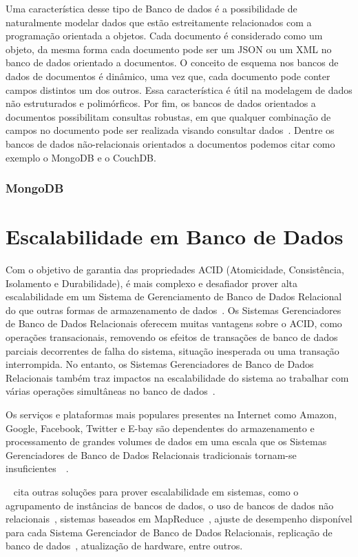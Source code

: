 \documentclass[a4paper,12pt,onecolumn,titlepage]{article}
\begin{document}
Uma característica desse tipo de Banco de dados é a possibilidade de naturalmente modelar dados que estão estreitamente relacionados com a programação orientada a objetos. Cada documento é considerado como um objeto, da mesma forma cada documento pode ser um JSON ou um XML no banco de dados orientado a documentos. O conceito de esquema nos bancos de dados de documentos é dinâmico, uma vez que, cada documento pode conter campos distintos um dos outros. Essa característica é útil na modelagem de dados não estruturados e polimórficos. Por fim, os bancos de dados orientados a documentos possibilitam consultas robustas, em que qualquer combinação de campos no documento pode ser realizada visando consultar dados~\citep{patil:2017}. Dentre os bancos de dados não-relacionais orientados a documentos podemos citar como exemplo o MongoDB e o CouchDB.

\subsubsection{MongoDB}
\label{subsubsec:mongo}

\section{Escalabilidade em Banco de Dados}
\label{sec:escalabilidade}

Com o objetivo de garantia das propriedades ACID (Atomicidade, Consistência, Isolamento e Durabilidade), é mais complexo e desafiador prover alta escalabilidade em um Sistema de Gerenciamento de Banco de Dados Relacional do que outras formas de armazenamento de dados~\citep{fisher:2011}. Os Sistemas Gerenciadores de Banco de Dados Relacionais oferecem muitas vantagens sobre o ACID, como operações transacionais, removendo os efeitos de transações de banco de dados parciais decorrentes de falha do sistema, situação inesperada ou uma transação interrompida. No entanto, os Sistemas Gerenciadores de Banco de Dados Relacionais também traz impactos na escalabilidade do sistema ao trabalhar com várias operações simultâneas no banco de dados~\citep{silva:2015}.

Os serviços e plataformas mais populares presentes na Internet como Amazon, Google, Facebook, Twitter e E-bay são dependentes do armazenamento e processamento de grandes volumes de dados em uma escala que os Sistemas Gerenciadores de Banco de Dados Relacionais tradicionais tornam-se insuficientes~\citep{pokorny:2011}~\citep{rafique:2018}.

~\cite{silva:2015} cita outras soluções para prover escalabilidade em sistemas, como o agrupamento de instâncias de bancos de dados, o uso de bancos de dados não relacionais~\citep{pokorny:2011}, sistemas baseados em MapReduce~\citep{abouzeid:2009}, ajuste de desempenho disponível para cada Sistema Gerenciador de Banco de Dados Relacionais, replicação de banco de dados~\citep{kemme:2010}, atualização de hardware, entre outros.
\end{document}
